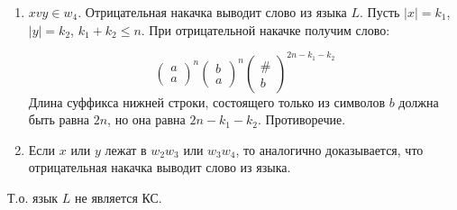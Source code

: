 \documentclass[a4paper, 14pt]{article}
\begin{document}
\begin{enumerate}
	\item{$xvy \in w_4$}. Отрицательная накачка выводит слово из языка $L$. Пусть $| x | = k_1$, $| y | = k_2$, $k_1 + k_2 \leq n$. При отрицательной накачке получим слово:

		\[
		\begin{pmatrix}
			a\\
			a
		\end{pmatrix}^{n}	
		\begin{pmatrix}
			b\\
			a
		\end{pmatrix}^{n}
		\begin{pmatrix}
			\# \\
			b	
		\end{pmatrix}^{2n - k_1 - k_2}		
		\]
		Длина суффикса нижней строки, состоящего только из символов $b$ должна быть равна $2n$, но она равна $2n - k_1 - k_2$. Противоречие.
	\item Если $x$ или $y$ лежат в $w_{2}w_{3}$ или $w_{3}w_{4}$, то аналогично доказывается, что отрицательная накачка выводит слово из языка.  
		
\end{enumerate}
Т.о. язык $L$ не является КС.
\end{document}
